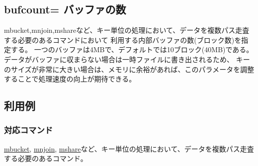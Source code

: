 
%

\subsection{bufcount= バッファの数\label{sect:option_bufcount}}
mbucket,mnjoin,mshareなど、キー単位の処理において、データを複数パス走査する必要のあるコマンドにおいて
利用する内部バッファの数(ブロック数)を指定する。
一つのバッファは4MBで、デフォルトでは10ブロック(40MB)である。
データがバッファに収まらない場合は一時ファイルに書き出されるため、
キーのサイズが非常に大きい場合は、メモリに余裕があれば、このパラメータを調整することで処理速度の向上が期待できる。

\subsection*{利用例}


\subsubsection*{対応コマンド}
\hyperref[sect:mbucket]{mbucket},
\hyperref[sect:mnjoin]{mnjoin},
\hyperref[sect:mshare]{mshare}など、キー単位の処理において、データを複数パス走査する必要のあるコマンド。

%

